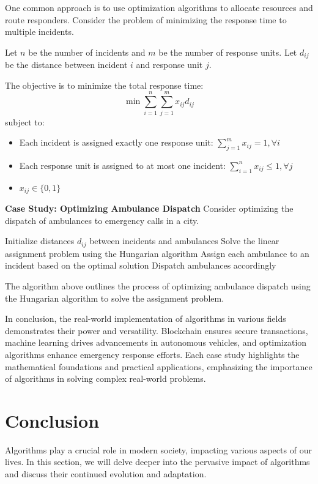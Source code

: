\documentclass[12pt]{book} %
\begin{document}
One common approach is to use optimization algorithms to allocate resources and route responders. Consider the problem of minimizing the response time to multiple incidents.

Let $n$ be the number of incidents and $m$ be the number of response units. Let $d_{ij}$ be the distance between incident $i$ and response unit $j$.

The objective is to minimize the total response time:
\[
\min \sum_{i=1}^{n} \sum_{j=1}^{m} x_{ij} d_{ij}
\]
subject to:
\begin{itemize}
    \item Each incident is assigned exactly one response unit: $\sum_{j=1}^{m} x_{ij} = 1, \forall i$
    \item Each response unit is assigned to at most one incident: $\sum_{i=1}^{n} x_{ij} \leq 1, \forall j$
    \item $x_{ij} \in \{0, 1\}$
\end{itemize}

\textbf{Case Study: Optimizing Ambulance Dispatch}
Consider optimizing the dispatch of ambulances to emergency calls in a city.
\FloatBarrier
\begin{algorithm}
\caption{Ambulance Dispatch Optimization}
\begin{algorithmic}[1]
\State Initialize distances $d_{ij}$ between incidents and ambulances
\State Solve the linear assignment problem using the Hungarian algorithm
\State Assign each ambulance to an incident based on the optimal solution
\State Dispatch ambulances accordingly
\end{algorithmic}
\end{algorithm}
\FloatBarrier

The algorithm above outlines the process of optimizing ambulance dispatch using the Hungarian algorithm to solve the assignment problem.

In conclusion, the real-world implementation of algorithms in various fields demonstrates their power and versatility. Blockchain ensures secure transactions, machine learning drives advancements in autonomous vehicles, and optimization algorithms enhance emergency response efforts. Each case study highlights the mathematical foundations and practical applications, emphasizing the importance of algorithms in solving complex real-world problems.


\section{Conclusion}
Algorithms play a crucial role in modern society, impacting various aspects of our lives. In this section, we will delve deeper into the pervasive impact of algorithms and discuss their continued evolution and adaptation.
\end{document}
